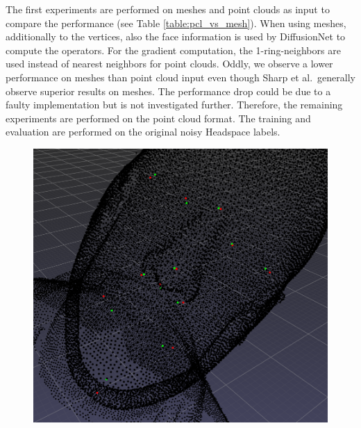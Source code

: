 \documentclass[class=article, crop=false]{standalone}
\begin{document}
The first experiments are performed on meshes and point clouds as input to compare the performance (see Table \ref{table:pcl_vs_mesh}). When using meshes, additionally to the vertices, also the face information is used by DiffusionNet to compute the operators. For the gradient computation, the 1-ring-neighbors are used instead of nearest neighbors for point clouds. Oddly, we observe a lower performance on meshes than point cloud input even though Sharp et al.\ generally observe superior results on meshes. The performance drop could be due to a faulty implementation but is not investigated further. Therefore, the remaining experiments are performed on the point cloud format. The training and evaluation are performed on the original noisy Headspace labels.
\begin{figure}[!htb]
\centering
   
 \includegraphics[width=\linewidth]{thesis/results/import/imgs/pred_gt_pt.png}
  \label{fig:pred_gt_pt}
\end{figure}
\end{document}
